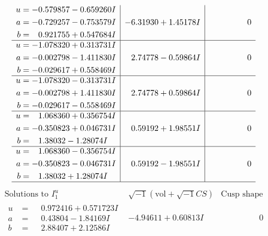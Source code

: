 \documentclass[1p]{elsarticle_modified}
\theoremstyle{definition}
\newcommand{\I}{\sqrt{-1}}
\begin{document}
$$\begin{array}{c|c|c}
\begin{aligned}
u &= -0.579857 - 0.659260 I \\
a &= -0.729257 - 0.753579 I \\
b &= \phantom{-}0.921755 + 0.547684 I\end{aligned}
 & -6.31930 + 1.45178 I & \phantom{-0.000000 } 0 \\ \hline\begin{aligned}
u &= -1.078320 + 0.313731 I \\
a &= -0.002798 - 1.411830 I \\
b &= -0.029617 + 0.558469 I\end{aligned}
 & \phantom{-}2.74778 - 0.59864 I & \phantom{-0.000000 } 0 \\ \hline\begin{aligned}
u &= -1.078320 - 0.313731 I \\
a &= -0.002798 + 1.411830 I \\
b &= -0.029617 - 0.558469 I\end{aligned}
 & \phantom{-}2.74778 + 0.59864 I & \phantom{-0.000000 } 0 \\ \hline\begin{aligned}
u &= \phantom{-}1.068360 + 0.356754 I \\
a &= -0.350823 + 0.046731 I \\
b &= \phantom{-}1.38032 - 1.28074 I\end{aligned}
 & \phantom{-}0.59192 + 1.98551 I & \phantom{-0.000000 } 0 \\ \hline\begin{aligned}
u &= \phantom{-}1.068360 - 0.356754 I \\
a &= -0.350823 - 0.046731 I \\
b &= \phantom{-}1.38032 + 1.28074 I\end{aligned}
 & \phantom{-}0.59192 - 1.98551 I & \phantom{-0.000000 } 0\\
 \hline 
 \end{array}$$\newpage$$\begin{array}{c|c|c}  
\text{Solutions to }I^u_{1}& \I (\text{vol} + \sqrt{-1}CS) & \text{Cusp shape}\\
 \hline 
\begin{aligned}
u &= \phantom{-}0.972416 + 0.571723 I \\
a &= \phantom{-}0.43804 - 1.84169 I \\
b &= \phantom{-}2.88407 + 2.12586 I\end{aligned}
 & -4.94611 + 0.60813 I & \phantom{-0.000000 } 0 \\ \hline\begin{aligned}

\end{aligned}
\end{array}$$
\end{document}
